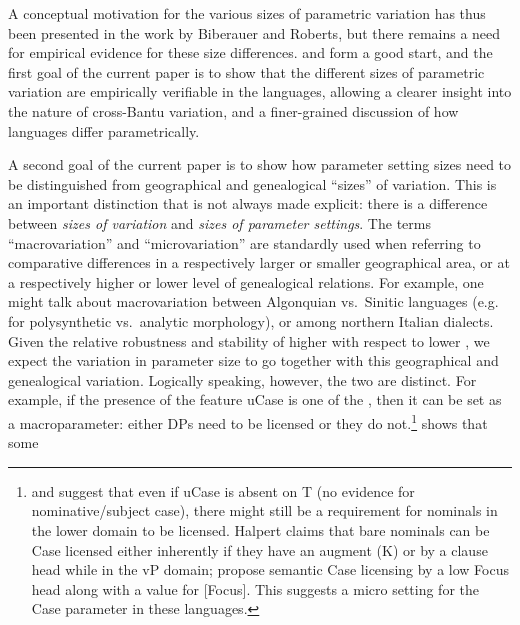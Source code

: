 \documentclass[output=paper]{langsci/langscibook}
\begin{document}
A conceptual motivation for the various sizes of parametric variation has thus
been presented in the work by Biberauer and Roberts, but there remains a need
for empirical evidence for these size differences.
\textcite{BibRob2012,BibRob2016} and \citet{Ledgeway2013} form a good start,
and the first goal of the current paper is to show that the different sizes of
parametric variation are empirically verifiable in the  languages,
allowing a clearer insight into the nature of cross-Bantu variation, and a
finer-grained discussion of how languages differ parametrically.

\largerpage
A second goal of the current paper is to show how parameter setting sizes need
to be distinguished from geographical and genealogical \enquote{sizes} of variation.
This is an important distinction that is not always made explicit: there is a
difference between \emph{sizes of variation} and \emph{sizes of parameter
settings}. The terms \enquote{macrovariation} and
\enquote{microvariation} are standardly used
when referring to comparative differences in a respectively larger or smaller
geographical area, or at a respectively higher or lower level of genealogical
relations. For example, one might talk about macrovariation between Algonquian
vs.\ Sinitic languages (e.g. for polysynthetic vs.\ analytic morphology), or
 among northern Italian dialects. Given the relative robustness
and stability of higher  with respect to lower , we expect
the variation in parameter size to go together with this geographical and
genealogical variation. Logically speaking, however, the two are distinct. For
example, if the presence of the feature uCase is one of the , then it
can be set as a macroparameter: either DPs need to be licensed or they do
not.\footnote{\textcite{Halpert2012,Halpert2016} and
    \citet{CarstensMletshe2015} suggest that even if uCase is absent on T (no
    evidence for nominative/subject case), there might still be a requirement
    for nominals in the lower domain to be licensed. Halpert claims that bare
    nominals can be Case licensed either inherently if they have an augment (K)
    or by a clause head while in the vP domain;
    \citeauthor{CarstensMletshe2015} propose semantic Case
    licensing by a low
Focus head along with a value for [Focus].  This suggests a micro setting for
the Case parameter in these languages.} \citet{Diercks2012} shows that some
\end{document}
